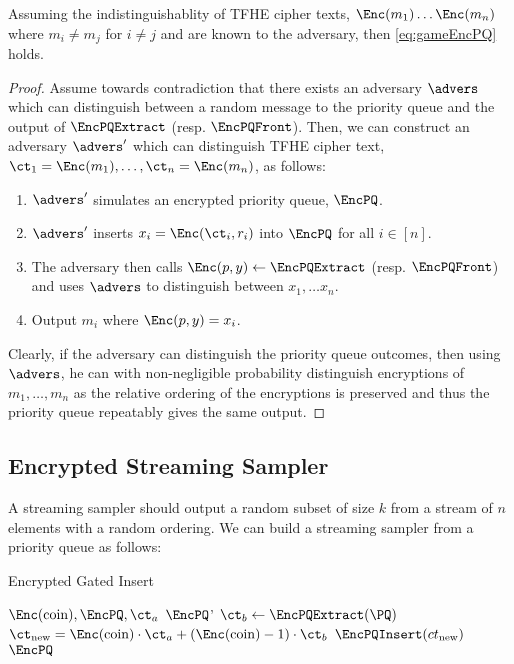 \begin{lemma}
	Assuming the indistinguishablity of TFHE cipher texts, $\Enc(m_1) \dots \Enc(m_n)$
	where $m_i \neq m_j$ for $i \neq j$ and are known to the adversary, then \cref{eq:gameEncPQ} holds.

	\begin{proof}
		Assume towards contradiction that there exists an adversary $\advers$ which can distinguish between a random
		message to the priority queue and the output of $\EncPQExtract$ (resp. $\EncPQFront$).
		Then, we can construct an adversary $\advers'$ which can distinguish TFHE cipher text, $\ct_1 = \Enc(m_1), \dots, \ct_n = \Enc(m_n)$, as follows:
		\begin{enumerate}
			\item $\advers'$ simulates an encrypted priority queue, $\EncPQ$.
			\item $\advers'$ inserts $x_i = \Enc(\ct_i, r_i)$ into $\EncPQ$ for all $i \in [n]$.
			\item The adversary then calls $\Enc(p, y) \gets \EncPQExtract$ (resp. $\EncPQFront$) and uses $\advers$ to distinguish between $x_1, \dots x_n$.
			\item Output $m_i$ where $\Enc(p, y) = x_i$.
		\end{enumerate}
		Clearly, if the adversary can distinguish the priority queue outcomes, then using $\advers$, he can with non-negligible probability
		distinguish encryptions of $m_1, \dots, m_n$ as the relative ordering of the encryptions is preserved and thus the priority queue repeatably gives the same output.
	\end{proof}
\end{lemma}


\subsection*{Encrypted Streaming Sampler}
A streaming sampler should output a random subset of size $k$ from a stream of $n$ elements with a random ordering.
We can build a streaming sampler from a priority queue as follows:


\begin{algorithm}
	\caption{Encrypted Gated Insert}
	\label{alg:EncIns}
	\begin{algorithmic}
		\Require $\Enc(\text{coin}), \EncPQ, \ct_a$
		\Ensure $\EncPQ$'
		\State $\ct_b \gets \EncPQExtract(\PQ)$
		\State $\ct_{\text{new}} = \Enc(\text{coin}) \cdot \ct_a + (\Enc(\text{coin}) - 1) \cdot \ct_b$
		\State $\EncPQInsert(ct_{\text{new}})$
		\State \Return $\EncPQ$
	\end{algorithmic}
\end{algorithm}

